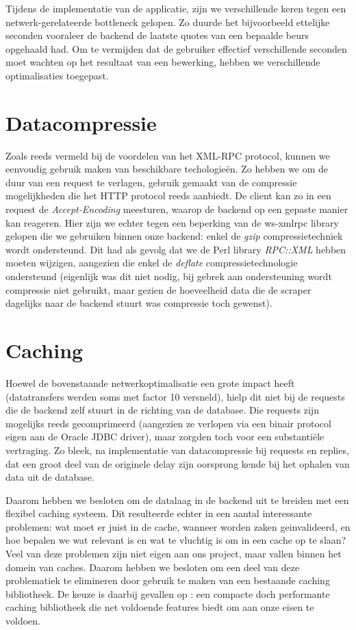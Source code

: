 Tijdens de implementatie van de applicatie, zijn we verschillende keren tegen een netwerk-gerelateerde bottleneck gelopen. Zo duurde het bijvoorbeeld ettelijke seconden vooraleer de backend de laatste quotes van een bepaalde beurs opgehaald had. Om te vermijden dat de gebruiker effectief verschillende seconden moet wachten op het resultaat van een bewerking, hebben we verschillende optimalisaties toegepast.

\section{Datacompressie}

Zoals reeds vermeld bij de voordelen van het XML-RPC protocol, kunnen we eenvoudig gebruik maken van beschikbare techologie\"en. Zo hebben we om de duur van een request te verlagen, gebruik gemaakt van de compressie mogelijkheden die het HTTP protocol reeds aanbiedt. De client kan zo in een request de \emph{Accept-Encoding} meesturen, waarop de backend op een gepaste manier kan reageren. Hier zijn we echter tegen een beperking van de ws-xmlrpc library gelopen die we gebruiken binnen onze backend: enkel de \emph{gzip} compressietechniek wordt ondersteund. Dit had als gevolg dat we de Perl library \emph{RPC::XML} hebben moeten wijzigen, aangezien die enkel de \emph{deflate} compressietechnologie ondersteund (eigenlijk was dit niet nodig, bij gebrek aan ondersteuning wordt compressie niet gebruikt, maar gezien de hoeveelheid data die de scraper dagelijks naar de backend stuurt was compressie toch gewenst).

\section{Caching}

Hoewel de bovenstaande netwerkoptimalisatie een grote impact heeft (datatransfers werden soms met factor 10 versneld), hielp dit niet bij de requests die de backend zelf stuurt in de richting van de database. Die requests zijn mogelijks reeds gecomprimeerd (aangezien ze verlopen via een binair protocol eigen aan de Oracle JDBC driver), maar zorgden toch voor een substantiële vertraging. Zo bleek, na implementatie van datacompressie bij requests en replies, dat een groot deel van de originele delay zijn oorsprong kende bij het ophalen van data uit de database.

Daarom hebben we besloten om de datalaag in de backend uit te breiden met een flexibel caching systeem. Dit resulteerde echter in een aantal interessante problemen: wat moet er juist in de cache, wanneer worden zaken geinvalideerd, en hoe bepalen we wat relevant is en wat te vluchtig is om in een cache op te slaan? Veel van deze problemen zijn niet eigen aan ons project, maar vallen binnen het domein van caches. Daarom hebben we besloten om een deel van deze problematiek te elimineren door gebruik te maken van een bestaande caching bibliotheek. De keuze is daarbij gevallen op : een compacte doch performante caching bibliotheek die net voldoende features biedt om aan onze eisen te voldoen.

